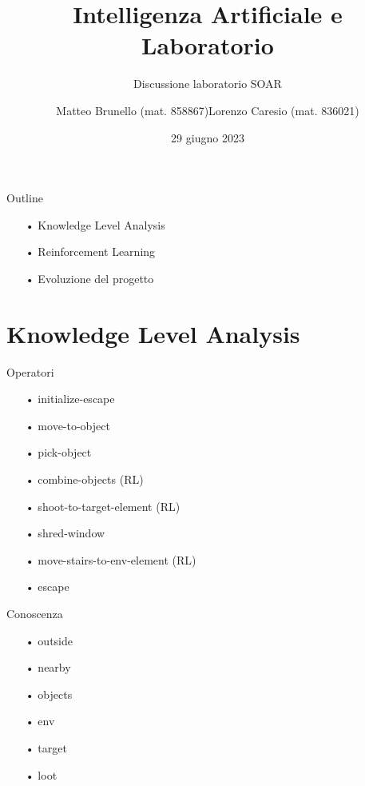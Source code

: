 \documentclass{beamer}
\title{Intelligenza Artificiale e Laboratorio}
\subtitle{Discussione laboratorio SOAR}
\date{29 giugno 2023}
\author{Matteo Brunello (mat. 858867)\newline Lorenzo Caresio (mat. 836021)}
\institute{Università degli Studi di Torino - Dipartimento di Informatica}
\begin{document}
    \maketitle

    \begin{frame}{Outline}
        \begin{itemize}
            \LARGE
            \item[•] Knowledge Level Analysis
            \item[•] Reinforcement Learning
            \item[•] Evoluzione del progetto
        \end{itemize}
    \end{frame}


    \section{Knowledge Level Analysis}

    \begin{frame}{Operatori}
        \begin{itemize}
            \LARGE
            \item[•] initialize-escape
            \item[•] move-to-object
            \item[•] pick-object
            \item[•] combine-objects (RL)
            \item[•] shoot-to-target-element (RL)
            \item[•] shred-window
            \item[•] move-stairs-to-env-element (RL)
            \item[•] escape
        \end{itemize}
    \end{frame}

    \begin{frame}{Conoscenza}
        \begin{itemize}
            \LARGE
            \item[•] outside
            \item[•] nearby
            \item[•] objects
            \item[•] env
            \item[•] target
            \item[•] loot
        \end{itemize}
    \end{frame}
\end{document}
